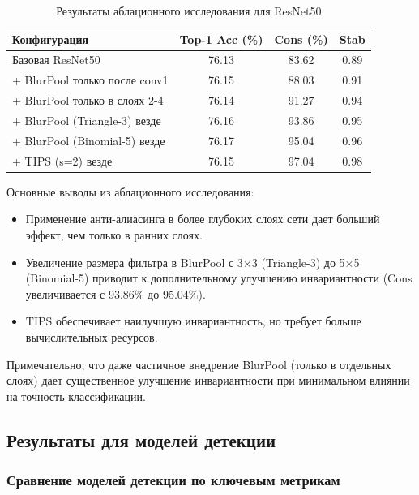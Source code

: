 \begin{table}[ht]
\centering
\caption{Результаты аблационного исследования для ResNet50}
\label{tab:ablation_study}
\begin{tabular}{|l|c|c|c|}
\hline
\textbf{Конфигурация} & \textbf{Top-1 Acc (\%)} & \textbf{Cons (\%)} & \textbf{Stab} \\ \hline
Базовая ResNet50 & 76.13 & 83.62 & 0.89 \\ \hline
+ BlurPool только после conv1 & 76.15 & 88.03 & 0.91 \\ \hline
+ BlurPool только в слоях 2-4 & 76.14 & 91.27 & 0.94 \\ \hline
+ BlurPool (Triangle-3) везде & 76.16 & 93.86 & 0.95 \\ \hline
+ BlurPool (Binomial-5) везде & 76.17 & 95.04 & 0.96 \\ \hline
+ TIPS (s=2) везде & 76.15 & 97.04 & 0.98 \\ \hline
\end{tabular}
\end{table}

Основные выводы из аблационного исследования:
\begin{itemize}
    \item Применение анти-алиасинга в более глубоких слоях сети дает больший эффект, чем только в ранних слоях.
    \item Увеличение размера фильтра в BlurPool с 3×3 (Triangle-3) до 5×5 (Binomial-5) приводит к дополнительному улучшению инвариантности (Cons увеличивается с 93.86\% до 95.04\%).
    \item TIPS обеспечивает наилучшую инвариантность, но требует больше вычислительных ресурсов.
\end{itemize}

Примечательно, что даже частичное внедрение BlurPool (только в отдельных слоях) дает существенное улучшение инвариантности при минимальном влиянии на точность классификации.

\subsection{Результаты для моделей детекции}
\label{sec:experiments:detection}

\subsubsection{Сравнение моделей детекции по ключевым метрикам}
\label{sec:experiments:detection:metrics}

